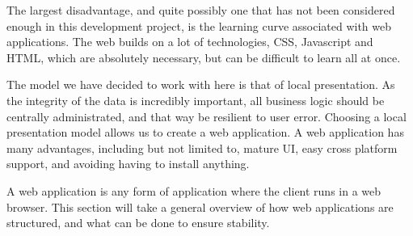The largest disadvantage, and quite possibly one that has not been considered enough in this development project, is the learning curve associated with web applications. 
The web builds on a lot of technologies, CSS, Javascript and HTML, which are absolutely necessary, but can be difficult to learn all at once.

The model we have decided to work with here is that of local presentation.
As the integrity of the data is incredibly important, all business logic should be centrally administrated, and that way be resilient to user error.
Choosing a local presentation model allows us to create a web application.
A web application has many advantages, including but not limited to, mature UI, easy cross platform support, and avoiding having to install anything.

A web application is any form of application where the client runs in a web browser.
This section will take a general overview of how web applications are structured, and what can be done to ensure stability.
